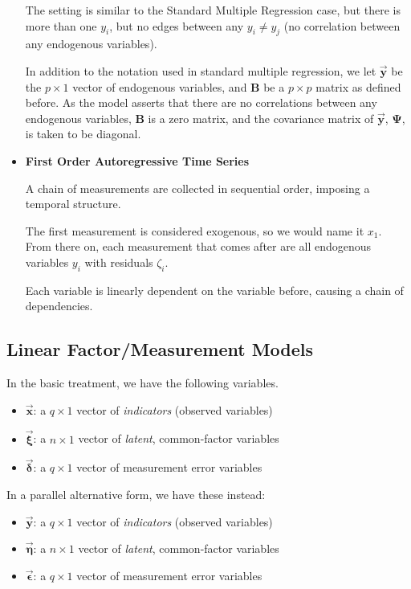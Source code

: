 \documentclass{article}
\begin{document}
\begin{multicols*}{2}
\begin{itemize}
    The setting is similar to the Standard Multiple Regression case, but there is more than one $y_i$, but no edges between any $y_i \neq y_j$ (no correlation between any endogenous variables).

    In addition to the notation used in standard multiple regression, we let $\mathbf{\vec{y}}$ be the $p \times 1$ vector of endogenous variables, and $\mathbf{B}$ be a $p \times p$ matrix as defined before. As the model asserts that there are no correlations between any endogenous variables, $\mathbf{B}$ is a zero matrix, and the covariance matrix of $\mathbf{\vec{y}}$, $\mathbf{\Psi}$, is taken to be diagonal.

    \item \textbf{First Order Autoregressive Time Series}
    
    A chain of measurements are collected in sequential order, imposing a temporal structure.

    The first measurement is considered exogenous, so we would name it $x_1$. From there on, each measurement that comes after are all endogenous variables $y_i$ with residuals $\zeta_i$. 
    
    Each variable is linearly dependent on the variable before, causing a chain of dependencies.
\end{itemize}

\subsection{Linear Factor/Measurement Models}

In the basic treatment, we have the following variables.

\begin{itemize}
    \item $\mathbf{\vec{x}}$: a $q \times 1$ vector of \textit{indicators} (observed variables)
    \item $\mathbf{\vec{\xi}}$: a $n \times 1$ vector of \textit{latent}, common-factor variables
    \item $\mathbf{\vec{\delta}}$: a $q \times 1$ vector of measurement error variables
\end{itemize}

In a parallel alternative form, we have these instead:

\begin{itemize}
    \item $\mathbf{\vec{y}}$: a $q \times 1$ vector of \textit{indicators} (observed variables)
    \item $\mathbf{\vec{\eta}}$: a $n \times 1$ vector of \textit{latent}, common-factor variables
    \item $\mathbf{\vec{\epsilon}}$: a $q \times 1$ vector of measurement error variables
\end{itemize}


\end{multicols*}
\end{document}
